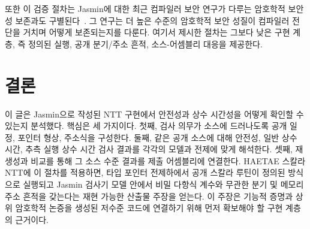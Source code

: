 \documentclass[10pt,twocolumn]{article}
\newcommand{\haetae}{HAETAE}
\newcommand{\jasmin}{Jasmin}
\newcommand{\ct}{상수 시간}
\newcommand{\sct}{추측 실행 상수 시간}
\begin{document}
또한 이 검증 절차는 \jasmin{}에 대한 최근 컴파일러 보안 연구가 다루는
암호학적 보안성 보존과도 구별된다~\cite{ArranzOlmos2025JasminSecurity}.
그 연구는 더 높은 수준의 암호학적 보안 성질이 컴파일러 전단을 거치며
어떻게 보존되는지를 다룬다. 여기서 제시한 절차는 그보다 낮은 구현 계층,
즉 정의된 실행, 공개 분기/주소 흔적, 소스-어셈블리 대응을 제공한다.

\section{결론}

이 글은 \jasmin{}으로 작성된 NTT 구현에서 안전성과 상수 시간성을
어떻게 확인할 수 있는지 분석했다. 핵심은 세 가지이다. 첫째, 검사
의무가 소스에 드러나도록 공개 일정, 포인터 형상, 주소식을 구성한다.
둘째, 같은 공개 소스에 대해 안전성, 일반 \ct{}, \sct{} 검사 결과를
각각의 모델과 전제에 맞게 해석한다. 셋째, 재생성과 비교를 통해 그
소스 수준 결과를 제출 어셈블리에 연결한다. \haetae{} 스칼라 NTT에
이 절차를 적용하면, 타입 포인터 전제하에서 공개 스칼라 루틴이 정의된
방식으로 실행되고 \jasmin{} 검사기 모델 안에서 비밀 다항식 계수와
무관한 분기 및 메모리 주소 흔적을 갖는다는 재현 가능한 산출물 주장을
얻는다. 이 주장은 기능적 증명과 상위 암호학적 논증을 생성된 저수준
코드에 연결하기 위해 먼저 확보해야 할 구현 계층의 근거이다.



\end{document}
